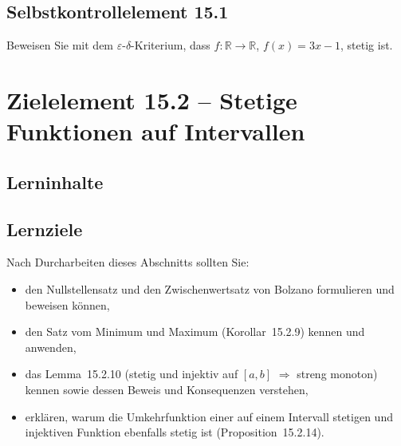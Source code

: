 \documentclass[a4paper,12pt]{article}
\begin{document}
\subsection*{Selbstkontrollelement 15.1}

Beweisen Sie mit dem $\varepsilon$-$\delta$-Kriterium, dass
$f: \mathbb{R} \to \mathbb{R}$, $f(x) = 3x - 1$, stetig ist.

\newpage

\section*{Zielelement 15.2 -- Stetige Funktionen auf Intervallen}

\subsection*{Lerninhalte}

\begin{center}
\end{center}

\subsection*{Lernziele}

Nach Durcharbeiten dieses Abschnitts sollten Sie:
\begin{itemize}
  \item den Nullstellensatz und den Zwischenwertsatz von Bolzano formulieren und
        beweisen können,
  \item den Satz vom Minimum und Maximum (Korollar~15.2.9) kennen und anwenden,
  \item das Lemma~15.2.10 (stetig und injektiv auf $[a,b]$ $\Rightarrow$ streng monoton)
        kennen sowie dessen Beweis und Konsequenzen verstehen,
  \item erklären, warum die Umkehrfunktion einer auf einem Intervall stetigen und
        injektiven Funktion ebenfalls stetig ist (Proposition~15.2.14).
\end{itemize}
\end{document}
